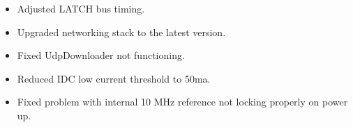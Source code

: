 \documentclass[letterpaper,10pt,english]{sphinxhowto}
\begin{document}
\begin{description}
\begin{itemize}
\end{itemize}

\begin{itemize}
\item {} 
\sphinxAtStartPar
Adjusted LATCH bus timing.

\end{itemize}

\begin{itemize}
\item {} 
\sphinxAtStartPar
Upgraded networking stack to the latest version.

\end{itemize}

\begin{itemize}
\item {} 
\sphinxAtStartPar
Fixed UdpDownloader not functioning.

\end{itemize}

\begin{itemize}
\item {} 
\sphinxAtStartPar
Reduced IDC low current threshold to 50ma.

\end{itemize}

\begin{itemize}
\item {} 
\sphinxAtStartPar
Fixed problem with internal 10 MHz reference not locking properly on power up.

\end{itemize}

\end{description}



\renewcommand{\indexname}{Index}
\printindex
\end{document}
